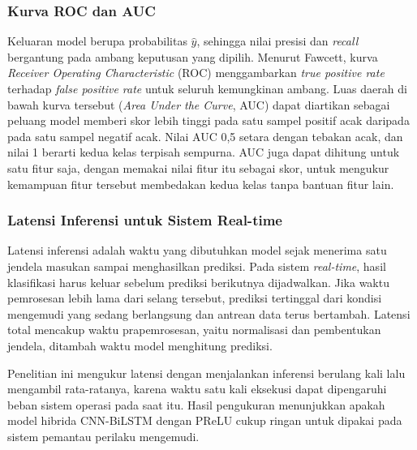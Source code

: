 \subsubsection{Kurva ROC dan AUC}
Keluaran model berupa probabilitas $\hat{y}$, sehingga nilai presisi dan \textit{recall} bergantung pada ambang keputusan yang dipilih. Menurut Fawcett, kurva \textit{Receiver Operating Characteristic} (ROC) menggambarkan \textit{true positive rate} terhadap \textit{false positive rate} untuk seluruh kemungkinan ambang. Luas daerah di bawah kurva tersebut (\textit{Area Under the Curve}, AUC) dapat diartikan sebagai peluang model memberi skor lebih tinggi pada satu sampel positif acak daripada pada satu sampel negatif acak. Nilai AUC 0,5 setara dengan tebakan acak, dan nilai 1 berarti kedua kelas terpisah sempurna. AUC juga dapat dihitung untuk satu fitur saja, dengan memakai nilai fitur itu sebagai skor, untuk mengukur kemampuan fitur tersebut membedakan kedua kelas tanpa bantuan fitur lain.

\subsubsection{Latensi Inferensi untuk Sistem Real-time}
Latensi inferensi adalah waktu yang dibutuhkan model sejak menerima satu jendela masukan sampai menghasilkan prediksi. Pada sistem \textit{real-time}, hasil klasifikasi harus keluar sebelum prediksi berikutnya dijadwalkan. Jika waktu pemrosesan lebih lama dari selang tersebut, prediksi tertinggal dari kondisi mengemudi yang sedang berlangsung dan antrean data terus bertambah. Latensi total mencakup waktu prapemrosesan, yaitu normalisasi dan pembentukan jendela, ditambah waktu model menghitung prediksi.

Penelitian ini mengukur latensi dengan menjalankan inferensi berulang kali lalu mengambil rata-ratanya, karena waktu satu kali eksekusi dapat dipengaruhi beban sistem operasi pada saat itu. Hasil pengukuran menunjukkan apakah model hibrida CNN-BiLSTM dengan PReLU cukup ringan untuk dipakai pada sistem pemantau perilaku mengemudi.
